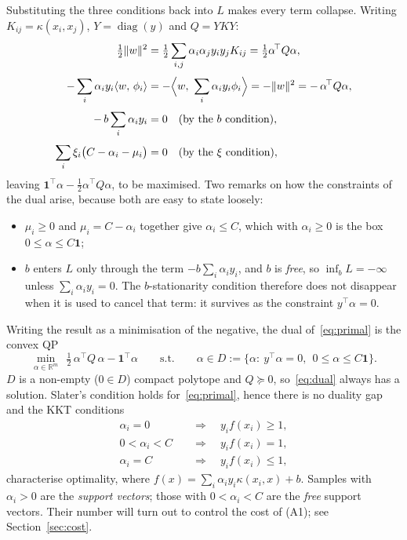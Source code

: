\documentclass[11pt,a4paper]{report}
\newcommand{\R}{\mathbb{R}}
\newcommand{\one}{\mathbf{1}}
\newcommand{\inner}[2]{\langle #1,\, #2 \rangle}
\begin{document}
Substituting the three conditions back into $L$ makes every term collapse. Writing
$K_{ij}=\kappa(x_i,x_j)$, $Y=\operatorname{diag}(y)$ and $Q=YKY$:
\begin{align*}
\tfrac12\|w\|^2 &= \tfrac12\sum_{i,j}\alpha_i\alpha_jy_iy_jK_{ij}
 = \tfrac12\alpha^{\!\top}Q\alpha, \\[1mm]
-\sum_i\alpha_iy_i\inner{w}{\phi_i}
 &= -\Bigl\langle w,\ \sum_i\alpha_iy_i\phi_i\Bigr\rangle = -\|w\|^2
 = -\,\alpha^{\!\top}Q\alpha, \\[1mm]
-\,b\sum_i\alpha_iy_i &= 0 \quad\text{(by the $b$ condition)},\\[1mm]
\sum_i\xi_i\bigl(C-\alpha_i-\mu_i\bigr) &= 0 \quad\text{(by the $\xi$ condition)},
\end{align*}
leaving $\one^{\!\top}\alpha-\tfrac12\alpha^{\!\top}Q\alpha$, to be maximised. Two
remarks on how the constraints of the dual arise, because both are easy to state
loosely:
\begin{itemize}
\item $\mu_i\ge0$ and $\mu_i=C-\alpha_i$ together give $\alpha_i\le C$, which with
      $\alpha_i\ge0$ is the box $0\le\alpha\le C\one$;
\item $b$ enters $L$ only through the term $-b\sum_i\alpha_iy_i$, and $b$ is
      \emph{free}, so $\inf_b L=-\infty$ unless $\sum_i\alpha_iy_i=0$. The
      $b$-stationarity condition therefore does not disappear when it is used to
      cancel that term: it survives as the constraint $y^{\!\top}\alpha=0$.
\end{itemize}
Writing the result as a minimisation of the negative, the dual of~\eqref{eq:primal}
is the convex QP
\begin{equation}
\label{eq:dual}
\tag{D}
\min_{\alpha\in\R^m}\ \ \tfrac12\,\alpha^{\!\top} Q\,\alpha-\one^{\!\top}\alpha
\qquad\text{s.t.}\qquad \alpha\in D:=\bigl\{\alpha:\ y^{\!\top}\alpha=0,\ \ 0\le\alpha\le C\one\bigr\}.
\end{equation}
$D$ is a non-empty ($0\in D$) compact polytope and $Q\succeq0$, so~\eqref{eq:dual}
always has a solution. Slater's condition holds for~\eqref{eq:primal}, hence there
is no duality gap and the KKT conditions
\begin{equation}
\label{eq:kkt}
\begin{aligned}
\alpha_i=0\quad &\Longrightarrow\quad y_if(x_i)\ge1,\\
0<\alpha_i<C\quad &\Longrightarrow\quad y_if(x_i)=1,\\
\alpha_i=C\quad &\Longrightarrow\quad y_if(x_i)\le1,
\end{aligned}
\end{equation}
characterise optimality, where $f(x)=\sum_i\alpha_iy_i\kappa(x_i,x)+b$. Samples with
$\alpha_i>0$ are the \emph{support vectors}; those with $0<\alpha_i<C$ are the
\emph{free} support vectors. Their number will turn out to control the cost of (A1);
see Section~\ref{sec:cost}.
\end{document}
